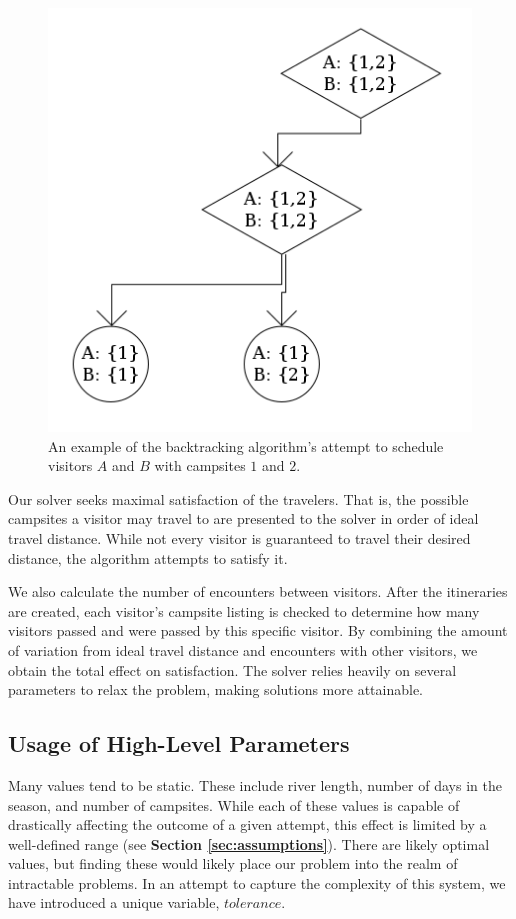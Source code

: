 \documentclass[11pt]{article} %
\begin{document}
\begin{figure}[h]
  \centering
  \includegraphics[scale=0.5]{imgs/searchExample.png}
  \caption{An example of the backtracking algorithm's attempt to schedule
     visitors $A$ and $B$ with campsites $1$ and $2$.}
  \label{fig:searchExample}
\end{figure}

Our solver seeks maximal satisfaction of the travelers.
That is, the possible campsites a visitor may travel to are presented to the
solver in order of ideal travel distance.  While not every visitor is guaranteed
to travel their desired distance, the algorithm attempts to satisfy it.

We also calculate the number of encounters
between visitors.  After the itineraries are created, each visitor's campsite
listing is checked to determine how many visitors passed and were passed by
this specific visitor.  By combining the amount of variation from ideal travel distance
and encounters with other visitors, we obtain the total effect on
satisfaction.  The solver relies heavily on several
parameters to relax the problem, making solutions more attainable.

\subsection{Usage of High-Level Parameters}
\label{sec:high-params}
Many values tend to be static.  These include river length, number of days in
the season, and number of campsites.  While each of these values is capable of
drastically affecting the outcome of a given attempt, this effect is limited
by a well-defined range (see \textbf{Section \ref{sec:assumptions}}).  There
are likely optimal values, but finding these would likely place our
problem into the realm of intractable problems.  In an attempt to capture
the complexity of this system, we have introduced a unique variable, $tolerance$.
\end{document}

